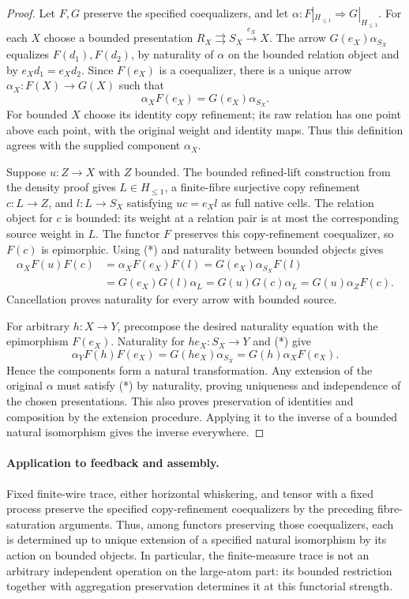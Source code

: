 \documentclass[11pt]{article}
\newcommand{\Ha}{H_{\leq 1}}
\newcommand{\Bb}{\Ha}
\begin{document}
\begin{proof}
Let $F,G$ preserve the specified coequalizers, and let
$\alpha:F|_{\Bb}\Rightarrow G|_{\Bb}$. For each $X$ choose a bounded
presentation $R_X\rightrightarrows S_X\xrightarrow{e_X}X$.
The arrow $G(e_X)\alpha_{S_X}$ equalizes $F(d_1),F(d_2)$, by naturality of
$\alpha$ on the bounded relation object and by $e_Xd_1=e_Xd_2$.
Since $F(e_X)$ is a coequalizer, there is a unique arrow
$\alpha_X:F(X)\to G(X)$ such that
\[
 \alpha_XF(e_X)=G(e_X)\alpha_{S_X}. \tag{*}
\]
For bounded $X$ choose its identity copy refinement; its raw relation has
one point above each point, with the original weight and identity maps.
Thus this definition agrees with the supplied component $\alpha_X$.

Suppose $u:Z\to X$ with $Z$ bounded. The bounded refined-lift construction
from the density proof gives $L\in\Bb$, a finite-fibre surjective copy
refinement $c:L\to Z$, and $l:L\to S_X$ satisfying $uc=e_Xl$ as full
native cells. The relation object for $c$ is bounded: its weight at a
relation pair is at most the corresponding source weight in $L$.
The functor $F$ preserves this copy-refinement coequalizer, so $F(c)$
is epimorphic. Using (*) and naturality between bounded objects gives
\begin{align*}
 \alpha_XF(u)F(c)
 &=\alpha_XF(e_X)F(l)
  =G(e_X)\alpha_{S_X}F(l)\\
 &=G(e_X)G(l)\alpha_L
  =G(u)G(c)\alpha_L
  =G(u)\alpha_ZF(c).
\end{align*}
Cancellation proves naturality for every arrow with bounded source.

For arbitrary $h:X\to Y$, precompose the desired naturality equation
with the epimorphism $F(e_X)$. Naturality for $he_X:S_X\to Y$ and (*)
give
\[
 \alpha_YF(h)F(e_X)
 =G(he_X)\alpha_{S_X}
 =G(h)\alpha_XF(e_X).
\]
Hence the components form a natural transformation. Any extension of the
original $\alpha$ must satisfy (*) by naturality, proving uniqueness and
independence of the chosen presentations. This also proves preservation of
identities and composition by the extension procedure. Applying it to the
inverse of a bounded natural isomorphism gives the inverse everywhere.
\end{proof}

\paragraph{Application to feedback and assembly.}
Fixed finite-wire trace, either horizontal whiskering, and tensor with a
fixed process preserve the specified copy-refinement coequalizers by the
preceding fibre-saturation arguments. Thus, among functors preserving those
coequalizers, each is determined up to unique extension of a specified
natural isomorphism by its action on bounded objects. In particular, the
finite-measure trace is not an arbitrary independent operation on the
large-atom part: its bounded restriction together with aggregation
preservation determines it at this functorial strength.
\end{document}

